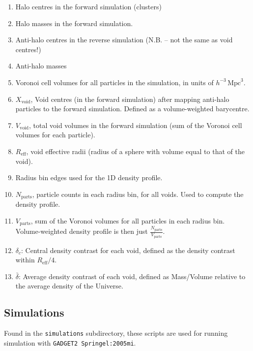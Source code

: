 \documentclass{article}
\newcommand{\codefont}[1]{{\texttt{#1}}}
\begin{document}
	\begin{enumerate}
		\item Halo centres in the forward simulation (clusters)
		\item Halo masses in the forward simulation.
		\item Anti-halo centres in the reverse simulation (N.B. -- not the same as void centres!)
		\item Anti-halo masses 
		\item Voronoi cell volumes for all particles in the simulation, in units of $h^{-3}\,\mathrm{Mpc}^{3}$.
		\item $X_{\mathrm{void}}$, Void centres (in the forward simulation) after mapping anti-halo particles to the forward simulation. Defined as a volume-weighted barycentre.
		\item $V_{\mathrm{void}}$, total void volumes in the forward simulation (sum of the Voronoi cell volumes for each particle).
		\item $R_{\mathrm{eff}}$, void effective radii (radius of a sphere with volume equal to that of the void).
		\item Radius bin edges used for the 1D density profile.
		\item $N_{\mathrm{parts}}$, particle counts in each radius bin, for all voids. Used to compute the density profile.
		\item $V_{\mathrm{parts}}$, sum of the Voronoi volumes for all particles in each radius bin. Volume-weighted density profile is then just $\frac{N_{\mathrm{parts}}}{V_{\mathrm{parts}}}$.
		\item $\delta_{c}$: Central density contrast for each void, defined as the density contrast within $R_{\mathrm{eff}}/4$.
		\item $\bar{\delta}$: Average density contrast of each void, defined as Mass/Volume relative to the average density of the Universe.
	\end{enumerate}
	
	\subsection{Simulations}
	\label{sec:simulations}
	
	Found in the \codefont{simulations} subdirectory, these scripts are used for running simulation with \codefont{GADGET2}~\codefont{Springel:2005mi}.
	
\end{document}
